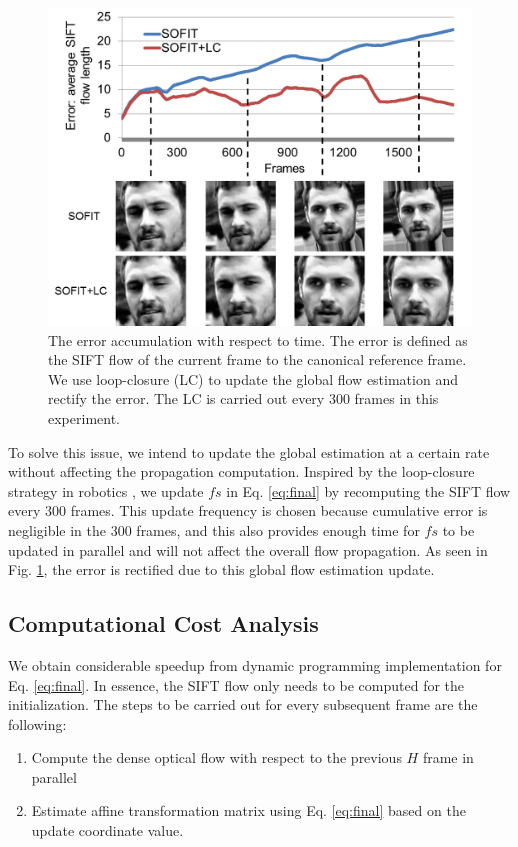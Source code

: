 \documentclass[10pt,journal]{IEEEtran}
\begin{document}
\begin{figure}[htbp]
	\centering
		\includegraphics[width=\columnwidth]{fig/error_prop.png}
	\caption{The error accumulation with respect to time. The error is defined as the SIFT flow of the current frame to the canonical reference frame. We use loop-closure (LC) to update the global flow estimation and rectify the error. The LC is carried out every $300$ frames in this experiment.}
	\label{fig_error_prop}
\end{figure}

To solve this issue, we intend to update the global estimation at a certain rate without affecting the propagation computation. Inspired by the loop-closure strategy in robotics \cite{close_loop_icra_05}, we update $fs$ in Eq. \ref{eq:final} by recomputing the SIFT flow every $300$ frames. This update frequency is chosen because cumulative error is negligible in the $300$ frames, and this also provides enough time for $fs$ to be updated in parallel and will not affect the overall flow propagation. As seen in Fig. \ref{fig_error_prop}, the error is rectified due to this global flow estimation update. 


\subsection{\label{sec:time}Computational Cost Analysis}
We obtain considerable speedup from dynamic programming implementation for Eq. \ref{eq:final}. In essence, the SIFT flow only needs to be computed for the initialization. The steps to be carried out for every subsequent frame are the following:
\begin{enumerate}
\item Compute the dense optical flow with respect to the previous $H$ frame in parallel
\item Estimate affine transformation matrix using Eq. \ref{eq:final} based on the update coordinate value.
\end{enumerate}
\end{document}
